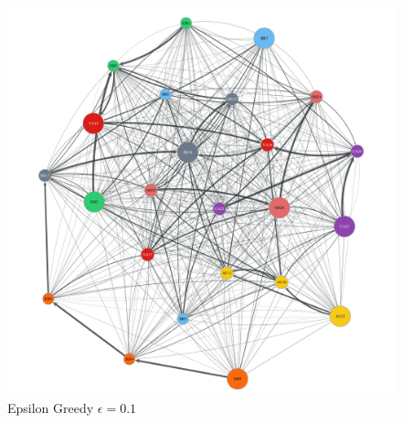 \begin{figure}[t]
      \includegraphics[width=\linewidth]{figures/b-epsilon-greedy-0-1-e2}
      \caption{Epsilon Greedy $\epsilon=0.1$}\label{fig:epsilon_greedy_e1}
    \endminipage
\end{figure}

